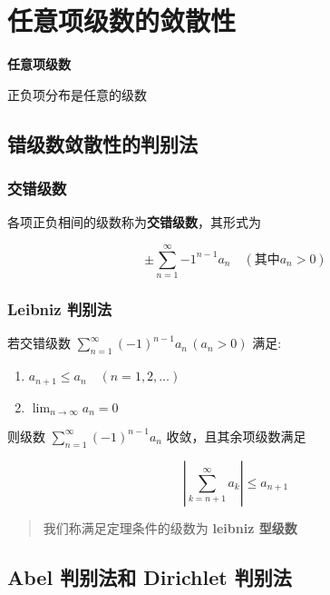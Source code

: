 \documentclass[lang = zh , final , oneside , openany , titlepage , zihao = -4 , linespread = 1.3 , baselineskip = false , cjk-font = windows , text-font = newtx , math-font = newtx , math-style = ISO , uppercase-greek = upright , integral-limits = false]{sjtureport}
\begin{document}
\section{任意项级数的敛散性}

\textbf{任意项级数}

正负项分布是任意的级数

\subsection{错级数敛散性的判别法}

\subsubsection{交错级数}

\begin{definition}
    各项正负相间的级数称为\textbf{交错级数}，其形式为

\[\pm\sum_{n=1}^\infty {-1}^{n-1}a_n \quad \left(\text{其中}a_n > 0\right)\]
\end{definition}

\subsubsection{Leibniz 判别法}

\begin{definition}
    若交错级数
\(\displaystyle \sum_{n=1}^\infty (-1)^{n-1}a_n \,\left(a_n>0\right)\)
满足:

\begin{enumerate}
\item
  \(a_{n+1} \leq a_n \quad \left(n = 1 ,2 ,\ldots\right)\)
\item
  \(\displaystyle\lim_{n\to\infty}a_n =0\)
\end{enumerate}

则级数 \(\displaystyle \sum_{n=1}^\infty (-1)^{n-1}a_n\)
收敛，且其余项级数满足

\[\left\vert \sum_{k=n+1}^\infty a_k \right\vert \leq a_{n+1}\]

\begin{quote}
我们称满足定理条件的级数为 \textbf{leibniz 型级数}
\end{quote}
\end{definition}

\subsection{Abel 判别法和 Dirichlet 判别法}
\end{document}
